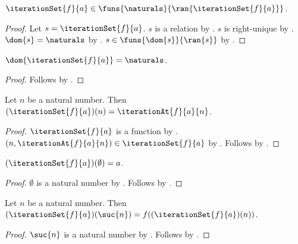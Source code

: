 \begin{theorem}\label{iteration_set_function}
    $\iterationSet{f}{a}\in
        \funs{\naturals}{\ran{\iterationSet{f}{a}}}$.
\end{theorem}
\begin{proof}
    Let $s=\iterationSet{f}{a}$.
    $s$ is a relation by .
    $s$ is right-unique
        by .
    $\dom{s}=\naturals$
        by .
    $s\in\funs{\dom{s}}{\ran{s}}$
        by .
\end{proof}

\begin{proposition}\label{iteration_set_domain}
    $\dom{\iterationSet{f}{a}}=\naturals$.
\end{proposition}
\begin{proof}
    Follows by .
\end{proof}

\begin{proposition}\label{iteration_set_apply}
    Let $n$ be a natural number.
    Then $(\iterationSet{f}{a})(n)=\iterationAt{f}{a}{n}$.
\end{proposition}
\begin{proof}
    $\iterationSet{f}{a}$ is a function
        by .
    $(n,\iterationAt{f}{a}{n})\in\iterationSet{f}{a}$
        by .
    Follows by .
\end{proof}

\begin{corollary}\label{iteration_set_zero}
    $(\iterationSet{f}{a})(\emptyset)=a$.
\end{corollary}
\begin{proof}
    $\emptyset$ is a natural number by .
    Follows by .
\end{proof}

\begin{corollary}\label{iteration_set_successor}
    Let $n$ be a natural number.
    Then $(\iterationSet{f}{a})(\suc{n})
        =f((\iterationSet{f}{a})(n))$.
\end{corollary}
\begin{proof}
    $\suc{n}$ is a natural number by .
    Follows by .
\end{proof}

